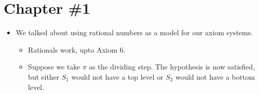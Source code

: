 \documentclass[12pt]{article}
\begin{document}
\section*{Chapter \#1}

\begin{itemize}
    \item We talked about using rational numbers as a model for our axiom systems.
    \begin{itemize}
        \item Rationals work, upto Axiom 6.
        \item Suppose we take $\pi$ as the dividing step. The hypothesis is now satisfied, but either $S_1$ would not have a top level or $S_2$ would not have a bottom level.
    \end{itemize}
\end{itemize}
\end{document}
